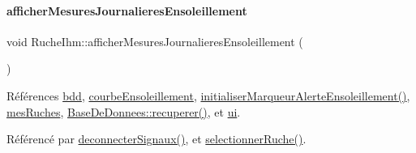 \mbox{\label{class_ruche_ihm_abc250d15e6782c522b3d6676e0ee032d}} 
\paragraph{\texorpdfstring{afficher\+Mesures\+Journalieres\+Ensoleillement}{afficherMesuresJournalieresEnsoleillement}}
{\footnotesize\ttfamily void Ruche\+Ihm\+::afficher\+Mesures\+Journalieres\+Ensoleillement (\begin{DoxyParamCaption}{ }\end{DoxyParamCaption})\hspace{0.3cm}{\ttfamily [slot]}}



Références \hyperlink{class_ruche_ihm_a0851936fe212e8d40538264f09749153}{bdd}, \hyperlink{class_ruche_ihm_af160181f408b3a9519b97e67c810a0fd}{courbe\+Ensoleillement}, \hyperlink{class_ruche_ihm_a6d52dd904573d1bfc9551421ab53e8cc}{initialiser\+Marqueur\+Alerte\+Ensoleillement()}, \hyperlink{class_ruche_ihm_ab7741fa67b19cbb2da7eb12c58cf83c1}{mes\+Ruches}, \hyperlink{class_base_de_donnees_a77539baad389f5acf754cd2cd452403e}{Base\+De\+Donnees\+::recuperer()}, et \hyperlink{class_ruche_ihm_a64786058bd7f88ca2f1e9743bb27c25b}{ui}.



Référencé par \hyperlink{class_ruche_ihm_a348a76106f3072dd31a382c6025b8113}{deconnecter\+Signaux()}, et \hyperlink{class_ruche_ihm_a7324ae6ea574ccdad47783f466933157}{selectionner\+Ruche()}.


